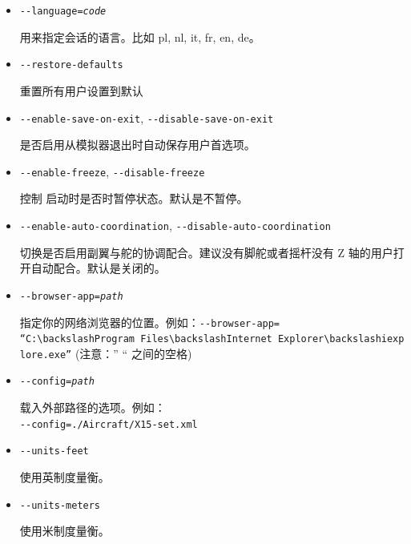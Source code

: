 \begin{itemize}
{\begin{itemize}
\item{\texttt{-$ $-language={\it code}}}

  用来指定会话的语言。比如 pl, nl, it, fr, en, de。

\item{\texttt{-$ $-restore-defaults}}

  重置所有用户设置到默认

\item{\texttt{-$ $-enable-save-on-exit}, \texttt{-$ $-disable-save-on-exit}}

  是否启用从模拟器退出时自动保存用户首选项。

\item{\texttt{-$ $-enable-freeze}, \texttt{-$ $-disable-freeze}}

  控制 \FlightGear{} 启动时是否时暂停状态。默认是不暂停。

\item{\texttt{-$ $-enable-auto-coordination}, \texttt{-$ $-disable-auto-coordination}}

  切换是否启用副翼与舵的协调配合。建议没有脚舵或者摇杆没有 Z 轴的用户打开自动配合。默认是关闭的。

\item{\texttt{-$ $-browser-app={\it path}}}

  指定你的网络浏览器的位置。例如：\texttt{-$ $-browser-app=}\\
    \texttt{``C:$\backslash$Program~Files$\backslash$Internet~Explorer$\backslash$iexplore.exe''}
    (注意：” “ 之间的空格)

\item{\texttt{-$ $-config={\it path}}}

  载入外部路径的选项。例如：\\
    \texttt{-$ $-config=./Aircraft/X15-set.xml}

\item{\texttt{-$ $-units-feet}}

  使用英制度量衡。

\item{\texttt{-$ $-units-meters}}

  使用米制度量衡。

\end{itemize}
  
}
\fi



\end{itemize}
